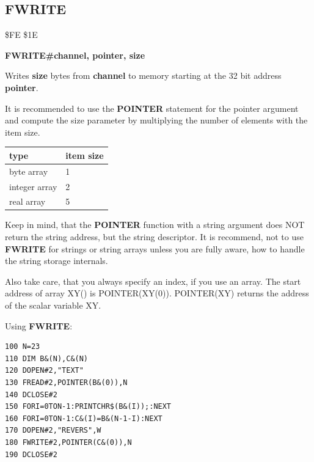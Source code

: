 
\newpage
\subsection{FWRITE}
\begin{description}[leftmargin=2cm,style=nextline]
\item [Token:] \$FE \$1E
\item [Format:] {\bf FWRITE\#channel, pointer, size}
\item [Usage:] Writes {\bf size} bytes from {\bf channel} to memory
               starting at the 32 bit address {\bf pointer}.

               It is recommended to use the {\bf POINTER} statement
               for the pointer argument and compute the size parameter
               by multiplying the number of elements with the item size.

{\ttfamily
\setlength{\tabcolsep}{1mm}
\begin{tabular}{|l|l|}
\hline
 type          & item size \\
\hline
byte     array &  1     \\
integer  array &  2     \\
real     array &  5     \\
\hline
\end{tabular}
}

Keep in mind, that the {\bf POINTER} function with a string argument
does NOT return the string address, but the string descriptor.
It is recommend, not to use {\bf FWRITE} for strings or string arrays
unless you are fully aware, how to handle the string storage internals.

Also take care, that you always specify an index, if you use an array.
The start address of array XY() is POINTER(XY(0)).
POINTER(XY) returns the address of the scalar variable XY.

\item [Example:] Using {\bf FWRITE}:
\begin{tcolorbox}[colback=black,coltext=white]
\verbatimfont{\codefont}
\begin{verbatim}
100 N=23
110 DIM B&(N),C&(N)
120 DOPEN#2,"TEXT"
130 FREAD#2,POINTER(B&(0)),N
140 DCLOSE#2
150 FORI=0TON-1:PRINTCHR$(B&(I));:NEXT
160 FORI=0TON-1:C&(I)=B&(N-1-I):NEXT
170 DOPEN#2,"REVERS",W
180 FWRITE#2,POINTER(C&(0)),N
190 DCLOSE#2
\end{verbatim}
\end{tcolorbox}
\end{description}

